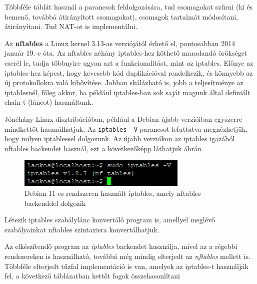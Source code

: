 Többféle táblát használ a parancsok feldolgozására, tud csomagokat szűrni (ki és bemenő, továbbá átirányított csomagokat), csomagok tartalmát módosítani, átirányítani. Tud NAT-ot is implementálni. \cite{iptables_man}

Az \textbf{nftables} a Linux kernel 3.13-as verziójától érhető el, pontosabban 2014 január 19.-e óta. Az nftables néhány iptables-hez köthető maradandó örökséget cserél le, tudja többnyire ugyan azt a funkcionalitást, mint az iptables. Előnye az iptables-hez képest, hogy kevesebb kód duplikációval rendelkezik, és könnyebb az új protokollokra való kibővítése. \cite{nftables}
Jobban skálázható is, jobb a teljesítménye az iptablesnél, főleg akkor, ha például iptables-ban sok saját magunk által definiált chain-t (láncot) használtunk.

Jónéhány Linux disztribúcióban, például a Debian újabb verzióiban egyszerre mindkettőt használhatjuk. Az \texttt{iptables -V} parancsot lefuttatva megnézhetjük, hogy milyen iptablessel dolgozunk. Az újabb verziókon az iptables igazából nftables backendet használ, ezt a következőképp láthatjuk  ábrán.
\begin{figure}[h]
\centering
\includegraphics[scale=1.0]{images/iptables_nftables.png}
\caption{Debian 11-es rendszeren használt iptables, amely nftables backenddel dolgozik}
\label{fig:iptables_nftables}
\end{figure}

Létezik iptables szabálylánc konvertáló program is, amellyel meglévő szabályainkat nftables szintaxisra konvertálhatjuk. 

Az elkészítendő program az \textit{iptables} backendet használja, mivel az a régebbi rendszereken is használható, továbbá még mindig elterjedt az \textit{nftables} mellett is. Többféle elterjedt tűzfal implementáció is van, amelyek az iptables-t használják fel, a következő  táblázatban kettőt fogok összehasonlítani

